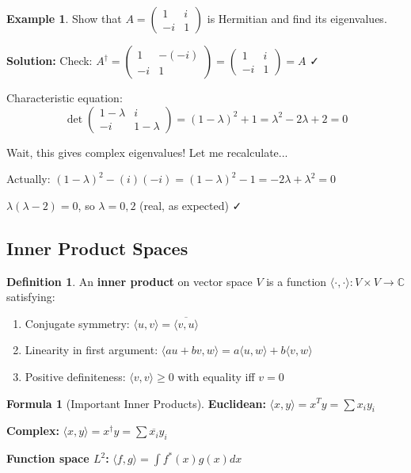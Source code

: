 \documentclass[12pt,a4paper]{article}
\theoremstyle{definition}
\newtheorem{definition}[theorem]{Definition}
\newtheorem{example}[theorem]{Example}
\newtheorem{formula}[theorem]{Formula}
\begin{document}
\begin{example}
Show that $A = \begin{pmatrix}1 & i \\ -i & 1\end{pmatrix}$ is Hermitian and find its eigenvalues.

\textbf{Solution:}
Check: $A^\dagger = \begin{pmatrix}1 & -(-i) \\ -i & 1\end{pmatrix} = \begin{pmatrix}1 & i \\ -i & 1\end{pmatrix} = A$ ✓

Characteristic equation:
\[
\det\begin{pmatrix}1-\lambda & i \\ -i & 1-\lambda\end{pmatrix} = (1-\lambda)^2 + 1 = \lambda^2 - 2\lambda + 2 = 0
\]

Wait, this gives complex eigenvalues! Let me recalculate...

Actually: $(1-\lambda)^2 - (i)(-i) = (1-\lambda)^2 - 1 = -2\lambda + \lambda^2 = 0$

$\lambda(\lambda - 2) = 0$, so $\lambda = 0, 2$ (real, as expected) ✓
\end{example}

\subsection{Inner Product Spaces}

\begin{definition}
An \textbf{inner product} on vector space $V$ is a function $\langle \cdot, \cdot \rangle : V \times V \to \mathbb{C}$ satisfying:
\begin{enumerate}
    \item Conjugate symmetry: $\langle u, v \rangle = \overline{\langle v, u \rangle}$
    \item Linearity in first argument: $\langle au + bv, w \rangle = a\langle u, w \rangle + b\langle v, w \rangle$
    \item Positive definiteness: $\langle v, v \rangle \geq 0$ with equality iff $v = 0$
\end{enumerate}
\end{definition}

\begin{formula}[Important Inner Products]
\textbf{Euclidean:} $\langle x, y \rangle = x^Ty = \sum x_iy_i$

\textbf{Complex:} $\langle x, y \rangle = x^\dagger y = \sum \overline{x_i}y_i$

\textbf{Function space $L^2$:} $\langle f, g \rangle = \int f^*(x)g(x)dx$
\end{formula}
\end{document}
